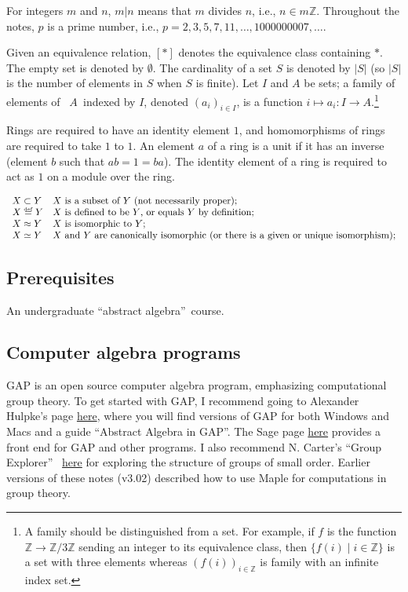 \documentclass[a4paper,11pt,final]{memoir}%
\theoremstyle{nonumberplain}
\begin{document}
For integers $m$ and $n$, $m|n$ means that $m$ divides $n$, i.e., $n\in
m\mathbb{Z}{}$. Throughout the notes, $p$ is a prime number, i.e.,
$p=2,3,5,7,11,\ldots,1000000007,\ldots$.

Given an equivalence relation, $[\ast]$ denotes the equivalence class
containing $\ast$. The empty set is denoted by $\emptyset$. The cardinality of
a set $S$ is denoted by $|S|$ (so $|S|$ is the number of elements in $S$ when
$S$ is finite). Let $I$ and $A$ be sets; a family of elements of\emph{\ }%
$A$\emph{\ }indexed by $I$, denoted $(a_{i})_{i\in I}$, is a function
$i\mapsto a_{i}\colon I\rightarrow A$.\footnote{A family should be
distinguished from a set. For example, if $f$ is the function $\mathbb{Z}%
{}\rightarrow\mathbb{Z}{}/3\mathbb{Z}{}$ sending an integer to its equivalence
class, then $\{f(i)\mid i\in\mathbb{Z\}}$ is a set with three elements whereas
$(f(i))_{i\in\mathbb{Z}{}}$ is family with an infinite index set.}

Rings are required to have an identity element $1$, and homomorphisms of rings
are required to take $1$ to $1$. An element $a$ of a ring is a unit if it has
an inverse (element $b$ such that $ab=1=ba$). The identity element of a ring
is required to act as $1$ on a module over the ring.

\noindent$%
\begin{array}
[c]{ll}%
X\subset Y & X\text{ is a subset of }Y\text{ (not necessarily proper);}\\
X\overset{\df}{=}Y & X\text{ is defined to be }Y\text{, or
equals }Y\text{ by definition;}\\
X\approx Y & X\text{ is isomorphic to }Y\text{;}\\
X\simeq Y & X\text{ and }Y\text{ are canonically isomorphic (or there is a
given or unique isomorphism);}%
\end{array}
$

\subsection{Prerequisites}

An undergraduate \textquotedblleft abstract algebra\textquotedblright\ course.

\subsection{Computer algebra programs}

GAP is an open source computer algebra program, emphasizing computational
group theory. To get started with GAP, I recommend going to Alexander Hulpke's
page \href{http://www.math.colostate.edu/~hulpke/CGT/education.html}{here},
where you will find versions of GAP for both Windows and Macs and a guide
\textquotedblleft Abstract Algebra in GAP\textquotedblright. The Sage page
\href{http://www.sagemath.org/}{here} provides a front end for GAP and other
programs. I also recommend N. Carter's \textquotedblleft Group
Explorer\textquotedblright%
\ \href{https://nathancarter.github.io/group-explorer/index.html}{here} for
exploring the structure of groups of small order. Earlier versions of these
notes (v3.02) described how to use Maple for computations in group theory.
\end{document}
